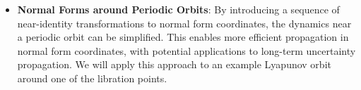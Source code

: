 \begin{itemize}
    \item \textbf{Normal Forms around Periodic Orbits}: By introducing a sequence of near-identity transformations to normal form coordinates, the dynamics near a periodic orbit can be simplified. This enables more efficient propagation in normal form coordinates, with potential applications to long-term uncertainty propagation. We will apply this approach to an example Lyapunov orbit around one of the libration points.
\end{itemize}
